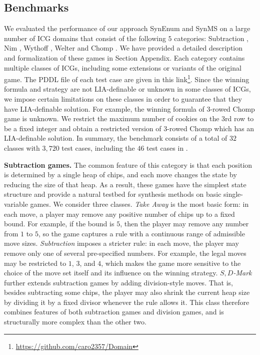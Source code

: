 \documentclass[review]{elsarticle}
\begin{document}
\subsection{Benchmarks}
We evaluated the performance of our approach SynEnum and SynMS on a large number of ICG domains that consist of the following $5$ categories: Subtraction \cite{Yag2001}, Nim \cite{Bou1901}, Wythoff \cite{Wyt1907}, Welter \cite{Wel1952} and Chomp \cite{Sch1952}.
We have provided a detailed description and formalization of these games in Section Appendix.
Each category contains multiple classes of ICGs, including some extensions or variants of the original game.
The PDDL file of each test case are given in this link\footnote{\url{https://github.com/caro2357/Domain}}.
Since the winning formula and strategy are not LIA-definable or unknown in some classes of ICGs, we impose certain limitations on these classes in order to guarantee that they have LIA-definable solution.
For example, the winning formula of 3-rowed Chomp game is unknown.
We restrict the maximum number of cookies on the 3rd row to be a fixed integer and obtain a restricted version of 3-rowed Chomp which has an LIA-definable solution.
In summary, the benchmark consists of a total of $32$ classes with $3,720$ test cases, including the $46$ test cases in \cite{WuFXLQCR2020}. 
 
{\color{red}\textbf{Subtraction games.} The common feature of this category is that each position is determined by a single heap of chips, and each move changes the state by reducing the size of that heap. 
As a result, these games have the simplest state structure and provide a natural testbed for synthesis methods on basic single-variable games. 
We consider three classes. 
\emph{Take Away} is the most basic form: in each move, a player may remove any positive number of chips up to a fixed bound. For example, if the bound is $5$, then the player may remove any number from $1$ to $5$, so the game captures a rule with a continuous range of admissible move sizes. 
\emph{Subtraction} imposes a stricter rule: in each move, the player may remove only one of several pre-specified numbers. For example, the legal moves may be restricted to $1$, $3$, and $4$, which makes the game more sensitive to the choice of the move set itself and its influence on the winning strategy. 
\emph{$S,D$-Mark} further extends subtraction games by adding division-style moves. 
That is, besides subtracting some chips, the player may also shrink the current heap size by dividing it by a fixed divisor whenever the rule allows it. 
This class therefore combines features of both subtraction games and division games, and is structurally more complex than the other two.}
\end{document}
